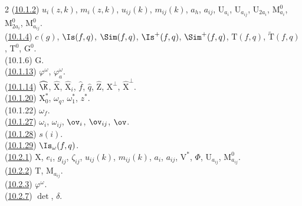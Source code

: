 \documentclass[12pt,a4paper,oneside,english]{smfart}
\newcommand{\btref}[1]{\hyperlink{bt:#1}{#1}}
\theoremstyle{definition}
\theoremstyle{bt}
\begin{document}
\begin{multicols}{2}
(\btref{10.1.2}) $u_i(z,k)$, $m_i(z,k)$, $u_{ij}(k)$, $m_{ij}(k)$, $a_h$, $a_{ij}$, $\mathrm{U}_{a_i}$, $\mathrm{U}_{a_{ij}}$, $\mathrm{U}_{2a_i}$, $\mathrm{M}^{0}_{a_i}$, $\mathrm{M}^{0}_{2a_i}$, $\mathrm{M}^{0}_{a_{ij}}$.\\
(\btref{10.1.4}) $c(g)$, $\Is(f,q)$, $\Sim(f,q)$, $\Is^{+}(f,q)$, $\Sim^{+}(f,q)$, $\mathrm{T}(f,q)$, $\widetilde{\mathrm{T}}(f,q)$, $\mathrm{T}^{0}$, $\mathrm{G}^{0}$.\\
(10.1.6) $\mathrm{G}$.\\
(\btref{10.1.13}) $\varphi^{\omega}$, $\varphi^{\omega}_a$.\\
(\btref{10.1.14}) $\widehat{\K}$, $\widehat{\mathrm{X}}$, $\widehat{\mathrm{X}}_i$, $\widehat{f}$, $\widehat{q}$, $\widehat{\mathrm{Z}}$, $\mathrm{X}^{\perp}$, $\widehat{\mathrm{X}}^{\perp}$.\\
(\btref{10.1.20}) $\mathrm{X}^{*}_0$, $\omega_q$, $\omega^{*}_1$, $z^{*}$.\\
(10.1.22) $\omega_f$.\\
(\btref{10.1.27}) $\omega_i$, $\omega_{ij}$, $\ov_i$, $\ov_{ij}$, $\ov$.\\
(\btref{10.1.28}) $s(i)$.\\
(\btref{10.1.29}) $\Is_\omega(f,q)$.\\
(\btref{10.2.1}) $\mathrm{X}$, $e_i$, $g_{ij}$, $\zeta_{ij}$, $u_{ij}(k)$, $m_{ij}(k)$, $a_i$, $a_{ij}$, $\mathrm{V}^{*}$, $\Phi$, $\mathrm{U}_{a_{ij}}$, $\mathrm{M}^{0}_{a_{ij}}$.\\
(\btref{10.2.2}) $\mathrm{T}$, $\mathrm{M}_{a_{ij}}$.\\
(\btref{10.2.3}) $\varphi^{\omega}$.\\
(\btref{10.2.7}) $\det$, $\delta$.
\end{multicols}
\normalsize
\end{document}
